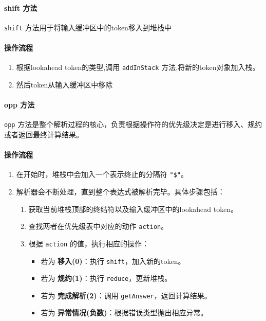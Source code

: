 \documentclass{article}
\begin{document}
\paragraph{shift 方法}
\texttt{shift} 方法用于将输入缓冲区中的token移入到堆栈中

\paragraph{操作流程}
\begin{enumerate}
    \item 根据lookahead token的类型,调用 \texttt{addInStack} 方法,将新的token对象加入栈。
    \item 然后token从输入缓冲区中移除
\end{enumerate}


\paragraph{opp 方法}
\texttt{opp} 方法是整个解析过程的核心，负责根据操作符的优先级决定是进行移入、规约或者返回最终计算结果。

\paragraph{操作流程}
\begin{enumerate}
    \item 在开始时，堆栈中会加入一个表示终止的分隔符 \texttt{"\$"}。
    \item 解析器会不断处理，直到整个表达式被解析完毕。具体步骤包括：
    \begin{enumerate}
        \item 获取当前堆栈顶部的终结符以及输入缓冲区中的lookahead token。
        \item 查找两者在优先级表中对应的动作 \texttt{action}。
        \item 根据 \texttt{action} 的值，执行相应的操作：
        \begin{itemize}
            \item 若为 \textbf{移入(0)}：执行 \texttt{shift}，加入新的token。
            \item 若为 \textbf{规约(1)}：执行 \texttt{reduce}，更新堆栈。
            \item 若为 \textbf{完成解析(2)}：调用 \texttt{getAnswer}，返回计算结果。
            \item 若为 \textbf{异常情况(负数)}：根据错误类型抛出相应异常。
        \end{itemize}
    \end{enumerate}
\end{enumerate}
\label{ref:Parser}
\end{document}
